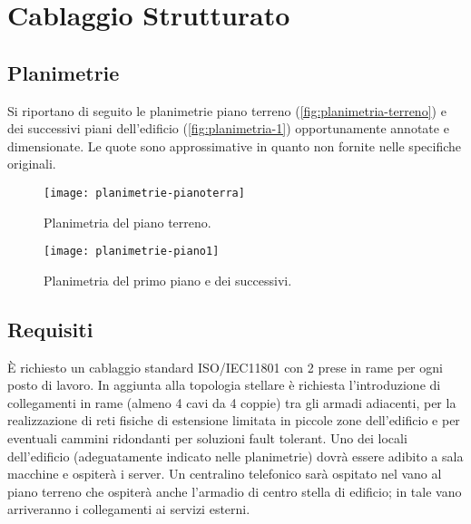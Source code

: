 %

\chapter{Cablaggio Strutturato}

\section{Planimetrie}
Si riportano di seguito le planimetrie piano terreno (\autoref{fig:planimetria-terreno}) e dei successivi piani
dell'edificio (\autoref{fig:planimetria-1}) opportunamente annotate e dimensionate.
Le quote sono approssimative in quanto non fornite nelle specifiche originali.

\begin{figure}[ht]
    \texttt{[image: planimetrie-pianoterra]}
    \caption{Planimetria del piano terreno.}
    \label{fig:planimetria-terreno}
\end{figure}

\begin{figure}[ht]
    \texttt{[image: planimetrie-piano1]}
    \caption{Planimetria del primo piano e dei successivi.}
    \label{fig:planimetria-1}
\end{figure}

\newpage
\section{Requisiti}
È richiesto un cablaggio standard ISO/IEC11801 con \num{2} prese in rame per ogni posto di lavoro.
In aggiunta alla topologia stellare è richiesta l’introduzione di collegamenti in rame (almeno \num{4} cavi da \num{4} coppie)
tra gli armadi adiacenti, per la realizzazione di reti fisiche di estensione limitata in piccole zone dell’edificio
e per eventuali cammini ridondanti per soluzioni fault tolerant.
Uno dei locali dell’edificio (adeguatamente indicato nelle planimetrie) dovrà essere adibito a sala macchine e
ospiterà i server.
Un centralino telefonico sarà ospitato nel vano al piano terreno che ospiterà anche l’armadio di centro stella di
edificio; in tale vano arriveranno i collegamenti ai servizi esterni.
